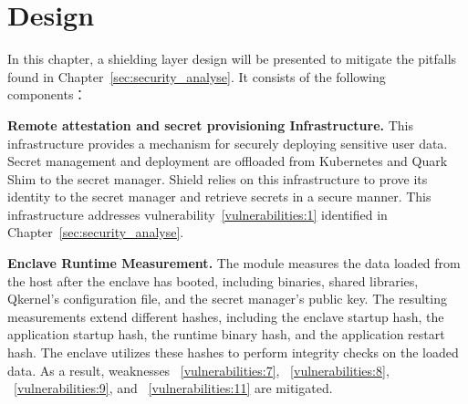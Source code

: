 \chapter{Design}
\label{sec:design}





In this chapter, a shielding layer design will be presented to mitigate the pitfalls found in Chapter~\ref{sec:security_analyse}. It consists of the following components：

\textbf{Remote attestation and secret provisioning Infrastructure.} This infrastructure provides a mechanism for securely deploying sensitive user data. Secret management and deployment are offloaded from Kubernetes and Quark Shim to the secret manager. Shield relies on this infrastructure to prove its 
identity to the secret manager and retrieve secrets in a secure manner. This infrastructure addresses vulnerability~\ref{vulnerabilities:1} identified in Chapter~\ref{sec:security_analyse}.

\textbf{Enclave Runtime Measurement.} The module measures the data loaded from the host after the enclave has booted, including binaries, shared libraries, Qkernel's configuration file, and the secret manager's public key. The resulting measurements extend different hashes, including the enclave startup hash, the application startup hash, the runtime binary hash, and 
the application restart hash. The enclave utilizes these hashes to perform integrity checks on the loaded data. As a result, weaknesses ~\ref{vulnerabilities:7}, ~\ref{vulnerabilities:8}, ~\ref{vulnerabilities:9}, and ~\ref{vulnerabilities:11} are mitigated.
 
